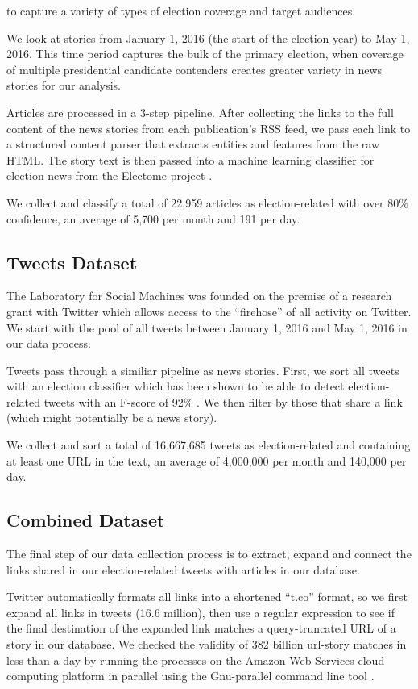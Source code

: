 \documentclass[letterpaper]{article}
\begin{document}
{ to capture a variety of types of election coverage and target audiences.
 
 We look at stories from January 1, 2016 (the start of the election year) to May 1, 2016. This time period captures the bulk of the primary election, when coverage of multiple presidential candidate contenders creates greater variety in news stories for our analysis.

Articles are processed in a 3-step pipeline. After collecting the links to the full content of the news stories from each publication's RSS feed, we pass each link to a structured content parser that extracts entities and features from the raw HTML. The story text is then passed into a machine learning classifier for election news from the Electome project \cite{ICWSMPAPERFROMLAST YEAR}. 

 We collect and classify a total of 22,959 articles as election-related with over 80\% confidence, an average of 5,700 per month and 191 per day.


\subsection{Tweets Dataset}

The Laboratory for Social Machines was founded on the premise of a research grant with Twitter which allows access to the ``firehose'' of all activity on Twitter. We start with the pool of all tweets between January 1, 2016 and May 1, 2016 in our data process.

Tweets pass through a similiar pipeline as news stories. First, we sort all tweets with an election classifier which has been shown to be able to detect election-related tweets with an F-score of 92\% \cite{vijayaraghavan2016automatic}. We then filter by those that share a link (which might potentially be a news story). 

We collect and sort a total of 16,667,685 tweets as election-related and containing at least one URL in the text, an average of 4,000,000 per month and 140,000 per day.

\subsection{Combined Dataset}
The final step of our data collection process is to extract, expand and connect the links shared in our election-related tweets with articles in our database.
 
Twitter automatically formats all links into a shortened ``t.co'' format, so we first expand all links in tweets (16.6 million), then use a regular expression to see if the final destination of the expanded link matches a query-truncated URL of a story in our database. We checked the validity of 382 billion url-story matches in less than a day by running the processes on the Amazon Web Services cloud computing platform in parallel using the Gnu-parallel command line tool \cite{tange2011gnu}.

}
\end{document}
